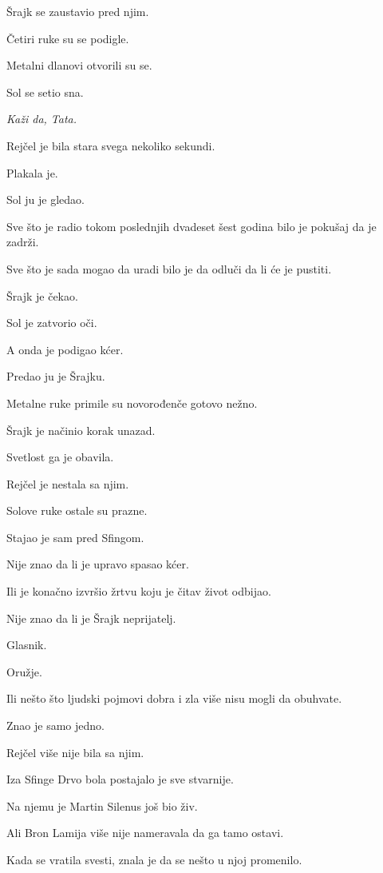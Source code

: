 Šrajk se zaustavio pred njim.

Četiri ruke su se podigle.

Metalni dlanovi otvorili su se.

Sol se setio sna.

\emph{Kaži da, Tata.}

Rejčel je bila stara svega nekoliko sekundi.

Plakala je.

Sol ju je gledao.

Sve što je radio tokom poslednjih dvadeset šest godina bilo je pokušaj da je zadrži.

Sve što je sada mogao da uradi bilo je da odluči da li će je pustiti.

Šrajk je čekao.

Sol je zatvorio oči.

A onda je podigao kćer.

Predao ju je Šrajku.

\bigskip

Metalne ruke primile su novorođenče gotovo nežno.

Šrajk je načinio korak unazad.

Svetlost ga je obavila.

Rejčel je nestala sa njim.

Solove ruke ostale su prazne.

\bigskip

Stajao je sam pred Sfingom.

Nije znao da li je upravo spasao kćer.

Ili je konačno izvršio žrtvu koju je čitav život odbijao.

Nije znao da li je Šrajk neprijatelj.

Glasnik.

Oružje.

Ili nešto što ljudski pojmovi dobra i zla više nisu mogli da obuhvate.

Znao je samo jedno.

Rejčel više nije bila sa njim.

\bigskip

Iza Sfinge Drvo bola postajalo je sve stvarnije.

Na njemu je Martin Silenus još bio živ.

Ali Bron Lamija više nije nameravala da ga tamo ostavi.

\bigskip

Kada se vratila svesti, znala je da se nešto u njoj promenilo.


